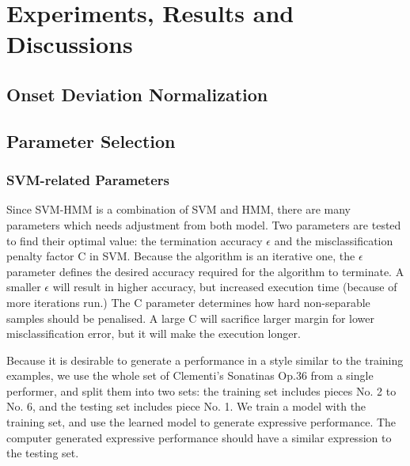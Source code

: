 \chapter{Experiments, Results and Discussions}
\label{chap:exp}
\section{Onset Deviation Normalization}

\section{Parameter Selection}
\subsection{SVM-related Parameters}
Since SVM-HMM is a combination of SVM and HMM, there are many parameters which needs adjustment from both model. Two parameters are tested to find their optimal value: the termination accuracy $\epsilon$ and the misclassification penalty factor C in SVM. Because the algorithm is an iterative one, the $\epsilon$ parameter defines the desired accuracy required for the algorithm to terminate. A smaller $\epsilon$ will result in higher accuracy, but increased execution time (because of more iterations run.) The C parameter determines how hard non-separable samples should be penalised. A large C will sacrifice larger margin for lower misclassification error, but it will make the execution longer.%

Because it is desirable to generate a performance in a style similar to the training examples, we use the whole set of Clementi's Sonatinas Op.36 from a single performer, and split them into two sets: the training set includes pieces No. 2 to No. 6, and the testing set includes piece No. 1. We train a model with the training set, and use the learned model to generate expressive performance. The computer generated expressive performance should have a similar expression to the testing set. 



